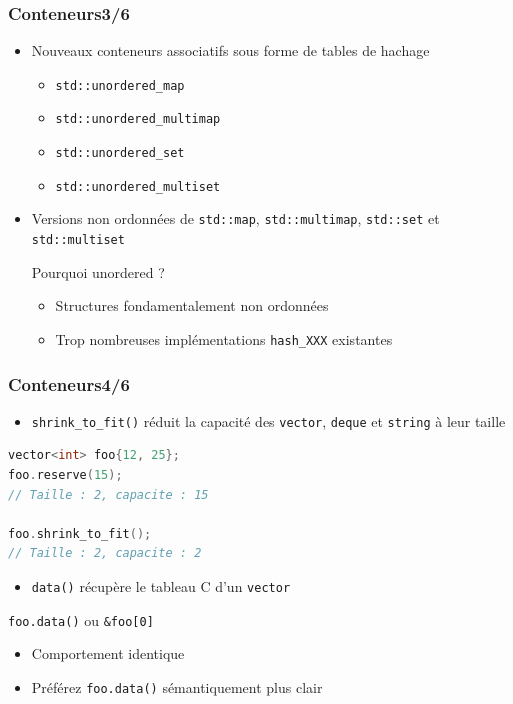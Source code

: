 \documentclass[C++.tex]{subfiles}
\begin{document}
\begin{frame}[fragile]
	\frametitle{Conteneurs\titlehfill{}3/6}
	\begin{itemize}
		\item Nouveaux conteneurs associatifs sous forme de tables de hachage
		\begin{itemize}
			\item \lstinline|std::unordered_map|
			\item \lstinline|std::unordered_multimap|
			\item \lstinline|std::unordered_set|
			\item \lstinline|std::unordered_multiset|
		\end{itemize}
		\item Versions non ordonnées de \lstinline|std::map|, \lstinline|std::multimap|, \lstinline|std::set| et \lstinline|std::multiset|

		\begin{block}{Pourquoi unordered ?}
			\begin{itemize}
				\item Structures fondamentalement non ordonnées
				\item Trop nombreuses implémentations \lstinline|hash_XXX| existantes
			\end{itemize}
		\end{block}
	\end{itemize}
\end{frame}

\begin{frame}[fragile]
	\frametitle{Conteneurs\titlehfill{}4/6}
	\begin{itemize}
		\item \lstinline|shrink_to_fit()| réduit la capacité des \lstinline|vector|, \lstinline|deque| et \lstinline|string| à leur taille
	\end{itemize}


	\begin{lstlisting}[language=C++]
vector<int> foo{12, 25};
foo.reserve(15);
// Taille : 2, capacite : 15

foo.shrink_to_fit();
// Taille : 2, capacite : 2\end{lstlisting}

	\begin{itemize}
		\item \lstinline|data()| récupère le \og tableau C\fg{} d'un \lstinline|vector|
	\end{itemize}

	\begin{block}{\lstinline|foo.data()| ou \lstinline|&foo[0]|}
		\begin{itemize}
			\item Comportement identique
			\item Préférez \lstinline|foo.data()| sémantiquement plus clair
		\end{itemize}
	\end{block}
\end{frame}
\end{document}
